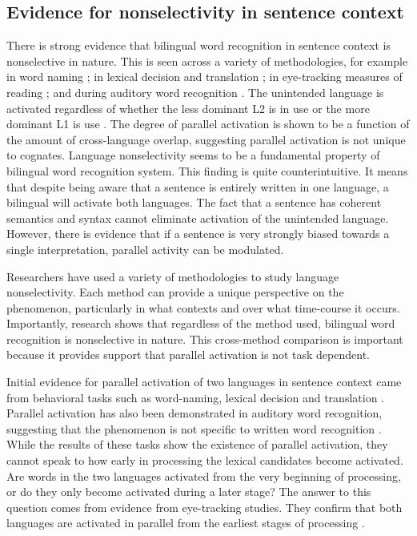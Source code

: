 \subsection{Evidence for nonselectivity in sentence context}\label{Intro::InContext::Evidence}
There is strong evidence that bilingual word recognition in sentence context is nonselective in nature. This is seen across a variety of methodologies, for example in word naming \parencite[e.g.,][]{Schwartz2006}; in lexical decision and translation \parencite[e.g.,][]{Baten2010, VanHell2008}; in eye-tracking measures of reading \parencite[e.g.,][]{Duyck2007, Libben2009, VanAssche2009, VanAssche2010}; and during auditory word recognition \parencite[][]{Chambers2009}. The unintended language is activated regardless of whether the less dominant L2 is in use \parencite[e.g.,][]{Baten2010,Chambers2009,Duyck2007, Libben2009, Schwartz2006,  VanAssche2010} or the more dominant L1 is use \parencite[e.g.,][]{VanAssche2009, Schwartz2006}. The degree of parallel activation is shown to be a function of the amount of cross-language overlap, suggesting parallel activation is not unique to cognates. Language nonselectivity seems to be a fundamental property of bilingual word recognition system. This finding is quite counterintuitive. It means that despite being aware that a sentence is entirely written in one language, a bilingual will activate both languages. The fact that a sentence has coherent semantics and syntax cannot eliminate activation of the unintended language. However, there is evidence that if a sentence is very strongly biased towards a single interpretation, parallel activity can be modulated.  

Researchers have used a variety of methodologies to study language nonselectivity. Each method can provide a unique perspective on the phenomenon, particularly in what contexts and over what time-course it occurs. Importantly, research shows that regardless of the method used, bilingual word recognition is nonselective in nature. This cross-method comparison is important because it provides support that parallel activation is not task dependent. 

Initial evidence for parallel activation of two languages in sentence context came from behavioral tasks such as word-naming, lexical decision and translation \parencite[e.g.,][]{Baten2010,Schwartz2006, VanHell2008}. Parallel activation has also been demonstrated in auditory word recognition, suggesting that the phenomenon is not specific to written word recognition \parencite[][]{Chambers2009}. While the results of these tasks show the existence of parallel activation, they cannot speak to how early in processing the lexical candidates become activated. Are words in the two languages activated from the very beginning of processing, or do they only become activated during a later stage? The answer to this question comes from evidence from eye-tracking studies. They confirm that both languages are activated in parallel from the earliest stages of processing \parencite[e.g.,][]{Duyck2007, Libben2009, VanAssche2009,  VanAssche2010}. 

